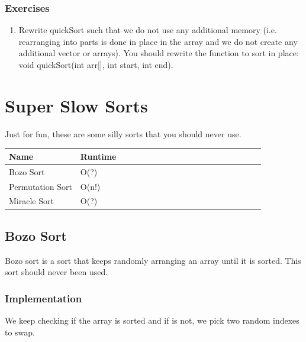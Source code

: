 \documentclass[11pt,oneside]{book}
\begin{document}
\subsection{Exercises}

\begin{enumerate}
\item Rewrite quickSort such that we do not use any additional memory (i.e. rearranging into parts is done in place in the array and we do not create any additional vector or arrays). You should rewrite the function to sort in place: void quickSort(int arr[], int start, int end).
\end{enumerate}

    \chapter{ Super Slow Sorts }
        

Just for fun, these are some silly sorts that you should never use.

\begin{center}\begin{tabulary}{0.4\linewidth}{|l|l|l|l|l|l|l|l|l|l|l|l|l|l|l|l|l|l|l}\hline


  Name &
  Runtime\\
\hline


  Bozo Sort &
  O(?)\\

  Permutation Sort &
  O(n!)\\

  Miracle Sort &
  O(?)\\

\hline\end{tabulary}\end{center}


        \section{ Bozo Sort }
        

Bozo sort is a sort that keeps randomly arranging an array until it is sorted. This sort should never been used.

\subsection{Implementation}

We keep checking if the array is sorted and if is not, we pick two random indexes to swap.
\end{document}
